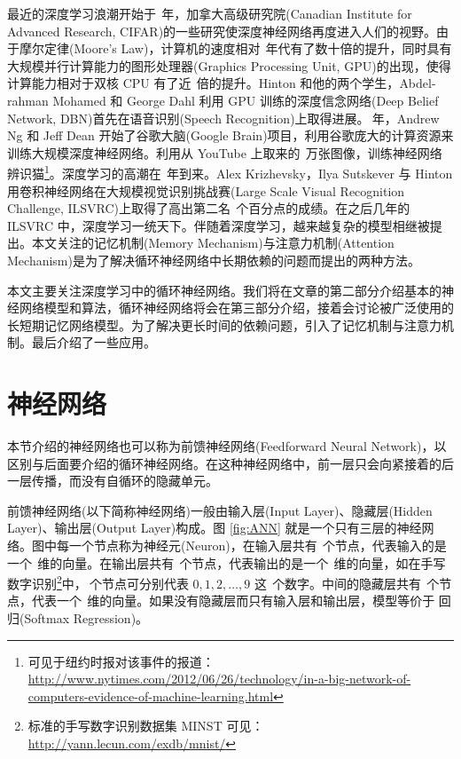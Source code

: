 \documentclass[12pt,a4paper]{article}
\begin{document}
最近的深度学习浪潮开始于$\:${}$\:$年，{\hei 加拿大高级研究院}({\crimson  Canadian Institute for Advanced Research, CIFAR})的一些研究使深度神经网络再度进入人们的视野。由于{\hei 摩尔定律}({\crimson Moore's Law})，计算机的速度相对$\:${}$\:$年代有了数十倍的提升，同时具有大规模并行计算能力的{\hei 图形处理器}({\crimson Graphics Processing Unit, GPU})的出现，使得计算能力相对于双核 {\crimson CPU} 有了近$\:${}$\:$倍的提升{\kai \cite{raina2009large}}。{\crimson Hinton} 和他的两个学生，{\crimson Abdel-rahman Mohamed} 和 {\crimson George Dahl} 利用 {\crimson GPU} 训练的{\hei 深度信念网络}({\crimson Deep Belief Network, DBN})首先在{\hei 语音识别}({\crimson Speech Recognition})上取得进展{\kai \cite{mohamed2009deep}}。{}$\:$年，{\crimson  Andrew Ng} 和 {\crimson Jeff Dean} 开始了{\hei 谷歌大脑}({\crimson Google Brain})项目，利用谷歌庞大的计算资源来训练大规模深度神经网络。利用从 {\crimson YouTube} 上取来的$\:${}$\:$万张图像，训练神经网络辨识猫\footnote{\hei 可见于纽约时报对该事件的报道：\url{http://www.nytimes.com/2012/06/26/technology/in-a-big-network-of-computers-evidence-of-machine-learning.html}}。深度学习的高潮在$\:${}$\:$年到来。{\crimson Alex Krizhevsky}，{\crimson Ilya Sutskever} 与 {\crimson Hinton} 用卷积神经网络在{\hei 大规模视觉识别挑战赛}({\crimson Large Scale Visual Recognition Challenge, ILSVRC})上取得了高出第二名$\:${}$\:$个百分点的成绩{\kai \cite{krizhevsky2012imagenet}}。在之后几年的 {\crimson ILSVRC} 中，深度学习一统天下。伴随着深度学习，越来越复杂的模型相继被提出。本文关注的{\hei 记忆机制}({\crimson Memory Mechanism})与{\hei 注意力机制}({\crimson Attention Mechanism})是为了解决循环神经网络中长期依赖的问题而提出的两种方法。

本文主要关注深度学习中的循环神经网络。我们将在文章的第二部分介绍基本的神经网络模型和算法，循环神经网络将会在第三部分介绍，接着会讨论被广泛使用的长短期记忆网络模型。为了解决更长时间的依赖问题，引入了记忆机制与注意力机制。最后介绍了一些应用。


\section{神经网络}

本节介绍的神经网络也可以称为{\hei 前馈神经网络}({\crimson Feedforward Neural Network})，以区别与后面要介绍的循环神经网络。在这种神经网络中，前一层只会向紧接着的后一层传播，而没有自循环的隐藏单元。

前馈神经网络(以下简称神经网络)一般由{\hei 输入层}({\crimson Input Layer})、{\hei 隐藏层}({\crimson Hidden Layer})、{\hei 输出层}({\crimson Output Layer})构成。图 {\kai \ref{fig:ANN}} 就是一个只有三层的神经网络。图中每一个节点称为{\hei 神经元}({\crimson Neuron})，在输入层共有$\:${}$\:$个节点，代表输入的是一个$\:${}$\:$维的向量。在输出层共有$\:${}$\:$个节点，代表输出的是一个$\:${}$\:$维的向量，如在手写数字识别\footnote{\hei 标准的手写数字识别数据集 {\crimson MINST} 可见：\url{http://yann.lecun.com/exdb/mnist/}}中，{}$\:$个节点可分别代表 $0,1,2,\ldots,9$ 这$\:${}$\:$个数字。中间的隐藏层共有$\:${}$\:$个节点，代表一个$\:${}$\:$维的向量。如果没有隐藏层而只有输入层和输出层，模型等价于 { 回归}({\crimson Softmax Regression})。
\end{document}
